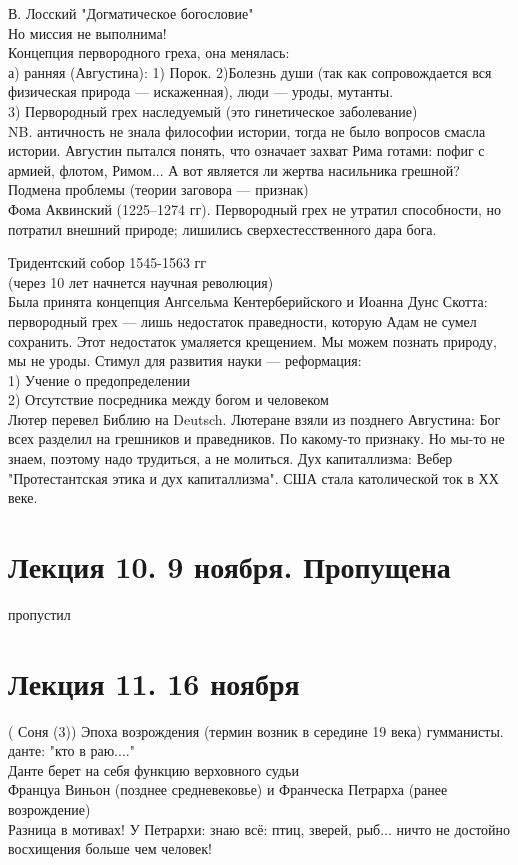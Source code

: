 \documentclass[a4paper,12pt]{article}
\begin{document}
В. Лосский "Догматическое богословие"\\
Но миссия не выполнима!\\
Концепция первородного греха, она менялась:\\
а) ранняя (Августина):
1) Порок. 2)Болезнь души (так как сопровождается вся физическая природа --- искаженная), люди --- уроды, мутанты.\\
3) Первородный грех наследуемый (это гинетическое заболевание)\\
NB. античность не знала философии истории, тогда не было вопросов смасла истории. Августин пытался понять, что означает захват Рима готами: пофиг с армией, флотом, Римом... А вот является ли жертва насильника грешной? Подмена проблемы (теории заговора --- признак)\\
Фома Аквинский (1225--1274 гг). Первородный грех не утратил способности, но потратил внешний природе; лишились сверхестесственного дара бога.

Тридентский собор 1545-1563 гг\\
(через 10 лет начнется научная революция)\\
Была принята концепция Ангсельма Кентерберийского и Иоанна Дунс Скотта: первородный грех --- лишь недостаток праведности, которую Адам не сумел сохранить. Этот недостаток умаляется крещением. Мы можем познать природу, мы не уроды. Стимул для развития науки --- реформация:\\
1) Учение о предопределении\\
2) Отсутствие посредника между богом и человеком\\
Лютер перевел Библию на Deutsch. Лютеране взяли из позднего Августина: Бог всех разделил на грешников и праведников. По какому-то признаку. Но мы-то не знаем, поэтому надо трудиться, а не молиться. Дух капиталлизма: Вебер "Протестантская этика и дух капиталлизма". США стала католической ток в ХХ веке.

\section{Лекция 10. 9 ноября. Пропущена} пропустил
\section{Лекция 11. 16 ноября}
( Соня (3)) 
Эпоха возрождения (термин возник в середине 19 века)
гумманисты. данте: "кто в раю...."\\
Данте берет на себя функцию верховного судьи\\
Француа Виньон (позднее средневековье) и Франческа Петрарха (ранее возрождение)\\
Разница в мотивах! У Петрархи: знаю всё: птиц, зверей, рыб... ничто не достойно восхищения больше чем человек!
\end{document}
